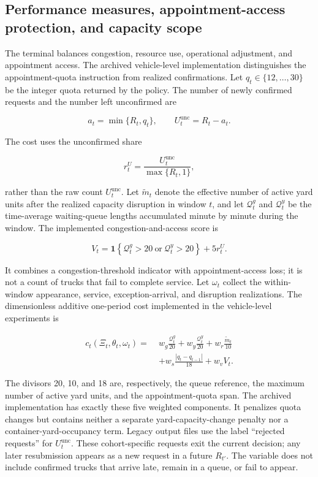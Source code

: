 \documentclass[preprint,12pt,authoryear,a4paper]{elsarticle}
\begin{document}
\subsection{Performance measures, appointment-access protection, and capacity scope}
\label{subsec:3-3-performance-measures-access-protection-and-capacity-scope}

The terminal balances congestion, resource use, operational adjustment, and appointment access. The archived vehicle-level implementation distinguishes the appointment-quota instruction from realized confirmations. Let \(q_t\in\{12,\ldots,30\}\) be the integer quota returned by the policy. The number of newly confirmed requests and the number left unconfirmed are

\[
a_t=\min\{R_t,q_t\},
\qquad
U_t^{\mathrm{unc}}=R_t-a_t.
\]

The cost uses the unconfirmed share

\[
r_t^U=\frac{U_t^{\mathrm{unc}}}{\max\{R_t,1\}},
\]

rather than the raw count \(U_t^{\mathrm{unc}}\). Let \(\widetilde m_t\) denote the effective number of active yard units after the realized capacity disruption in window \(t\), and let \(\mathcal Q_t^g\) and \(\mathcal Q_t^y\) be the time-average waiting-queue lengths accumulated minute by minute during the window. The implemented congestion-and-access score is

\[
V_t=
\mathbf 1
\left\{
\mathcal Q_t^g>20
\ \text{or}\
\mathcal Q_t^y>20
\right\}
+5r_t^U.
\]

It combines a congestion-threshold indicator with appointment-access loss; it is not a count of trucks that fail to complete service. Let \(\omega_t\) collect the within-window appearance, service, exception-arrival, and disruption realizations. The dimensionless additive one-period cost implemented in the vehicle-level experiments is

\[
\begin{aligned}
c_t(\Xi_t,\theta_t,\omega_t)
=\;&
w_g\frac{\mathcal Q_t^g}{20}
+w_y\frac{\mathcal Q_t^y}{20}
+w_r\frac{\widetilde m_t}{10}\\
&+w_s\frac{|q_t-q_{t-1}|}{18}
+w_v V_t .
\end{aligned}
\tag{3}
\]

The divisors 20, 10, and 18 are, respectively, the queue reference, the maximum number of active yard units, and the appointment-quota span. The archived implementation has exactly these five weighted components. It penalizes quota changes but contains neither a separate yard-capacity-change penalty nor a container-yard-occupancy term. Legacy output files use the label ``rejected requests'' for \(U_t^{\mathrm{unc}}\). These cohort-specific requests exit the current decision; any later resubmission appears as a new request in a future \(R_{t'}\). The variable does not include confirmed trucks that arrive late, remain in a queue, or fail to appear.
\end{document}
